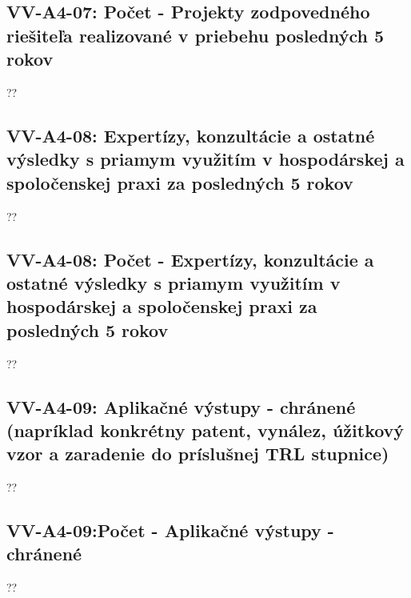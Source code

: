 \subsection*{VV-A4-07: Počet - Projekty zodpovedného riešiteľa realizované v priebehu posledných 5 rokov}
??\\
\subsection*{VV-A4-08: Expertízy, konzultácie a ostatné výsledky s priamym využitím v hospodárskej a spoločenskej praxi za posledných 5 rokov }
??\\
\subsection*{VV-A4-08: Počet - Expertízy, konzultácie a ostatné výsledky s priamym využitím v hospodárskej a spoločenskej praxi za posledných 5 rokov}
??\\

\subsection*{VV-A4-09: Aplikačné výstupy - chránené (napríklad konkrétny patent, vynález, úžitkový vzor a zaradenie do príslušnej TRL stupnice) }
??\\
\subsection*{VV-A4-09:Počet - Aplikačné výstupy - chránené }
??\\
